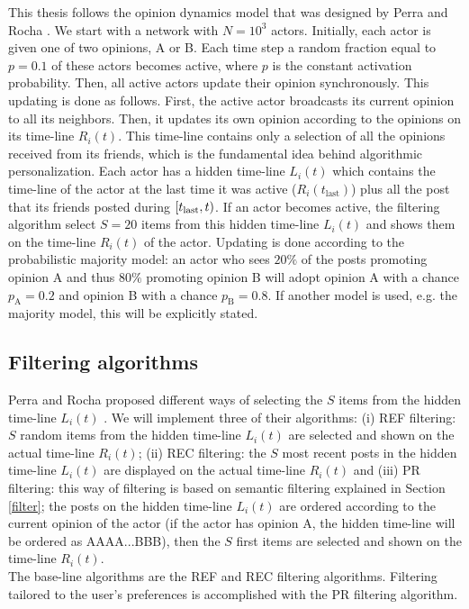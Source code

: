 \documentclass[11 pt , letterpaper , twoside , openright]{book}
\begin{document}
This thesis follows the opinion dynamics model that was designed by Perra and Rocha \cite{Perra2019}. We start with a network with $N = 10^3$ actors.  Initially, each actor is given one of two opinions, A or B. Each time step a random fraction equal to $p= 0.1$ of these actors becomes active, where $p$ is the constant activation probability. Then, all active actors update their opinion synchronously. This updating is done as follows. First, the active actor broadcasts its current opinion to all its neighbors. Then, it updates its own opinion according to the opinions on its time-line $R_i(t)$. This time-line contains only a selection of all the opinions received from its friends, which is the fundamental idea behind algorithmic personalization. Each actor has a hidden time-line $L_i(t)$ which contains the time-line of the actor at the last time it was active ($R_i(t_{\text{last}})$) plus all the post that its friends posted during $\interval[right open fence =), open right]{t_\text{last}}{t}$. If an actor becomes active, the filtering algorithm select $S = 20$ items from this hidden time-line $L_i(t)$ and shows them on the time-line $R_i(t)$ of the actor. Updating is done according to the probabilistic majority model: an actor who sees $20\%$ of the posts promoting opinion A and thus $80\%$ promoting opinion B will adopt opinion A with a chance $p_\text{A} = 0.2$ and opinion B with a chance $p_\text{B} = 0.8$. If another model is used, e.g. the majority model, this will be explicitly stated.

\subsection{Filtering algorithms}

Perra and Rocha proposed different ways of selecting the $S$ items from the hidden time-line $L_i(t)$ \cite{Perra2019}. We will implement three of their algorithms: (i) REF filtering: $S$ random items from the hidden time-line $L_i(t)$ are selected and shown on the actual time-line $R_i(t)$; (ii) REC filtering: the $S$ most recent posts in the hidden time-line $L_i(t)$ are displayed on the actual time-line $R_i(t)$ and (iii) PR filtering: this way of filtering is based on semantic filtering explained in Section \ref{filter}; the posts on the hidden time-line $L_i(t)$ are ordered according to the current opinion of the actor (if the actor has opinion A, the hidden time-line will be ordered as AAAA...BBB), then the $S$ first items are selected and shown on the time-line $R_i(t)$.\\
\newline
The base-line algorithms are the REF and REC filtering algorithms. Filtering tailored to the user's preferences is accomplished with the PR filtering algorithm.
\end{document}
